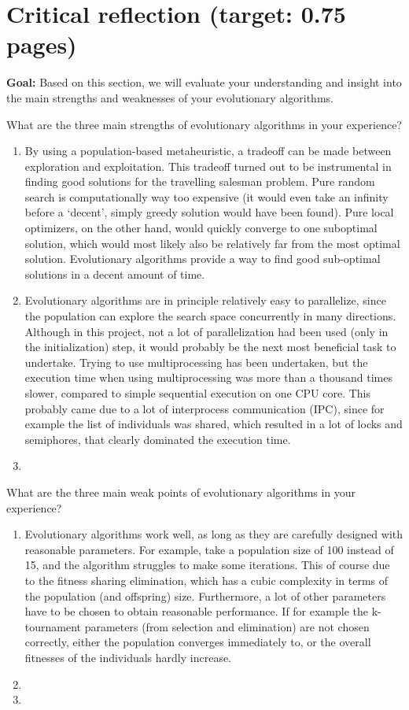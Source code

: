\documentclass[a4paper,10pt]{article}
\newcommand{\ReplaceMe}[1]{{\color{blue}#1}}
\newcommand{\RemoveMe}[1]{{\color{purple}#1}}
\begin{document}
\section{Critical reflection (target: 0.75 pages)}

\RemoveMe{\textbf{Goal:} Based on this section, we will evaluate your understanding and insight into the main strengths and weaknesses of your evolutionary algorithms.}

\ReplaceMe{What are the three main strengths of evolutionary algorithms in your experience?}

\begin{enumerate}
 \item By using a population-based metaheuristic, a tradeoff can be made between exploration and exploitation. This tradeoff turned out to be instrumental in finding good solutions for the travelling salesman problem. Pure random search is computationally way too expensive (it would even take an infinity before a `decent', simply greedy solution would have been found). Pure local optimizers, on the other hand, would quickly converge to one suboptimal solution, which would most likely also be relatively far from the most optimal solution. Evolutionary algorithms provide a way to find good sub-optimal solutions in a decent amount of time.
 \item Evolutionary algorithms are in principle relatively easy to parallelize, since the population can explore the search space concurrently in many directions. Although in this project, not a lot of parallelization had been used (only in the initialization) step, it would probably be the next most beneficial task to undertake. Trying to use multiprocessing has been undertaken, but the execution time when using multiprocessing was more than a thousand times slower, compared to simple sequential execution on one CPU core. This probably came due to a lot of interprocess communication (IPC), since for example the list of individuals was shared, which resulted in a lot of locks and semiphores, that clearly dominated the execution time.
 \item 
\end{enumerate}

\ReplaceMe{What are the three main weak points of evolutionary algorithms in your experience?}

\begin{enumerate}
 \item Evolutionary algorithms work well, as long as they are carefully designed with reasonable parameters. For example, take a population size of 100 instead of 15, and the algorithm struggles to make some iterations. This of course due to the fitness sharing elimination, which has a cubic complexity in terms of the population (and offspring) size. Furthermore, a lot of other parameters have to be chosen to obtain reasonable performance. If for example the k-tournament parameters (from selection and elimination) are not chosen correctly, either the population converges immediately to, or the overall fitnesses of the individuals hardly increase.
 \item 
 \item 
\end{enumerate}
\end{document}
